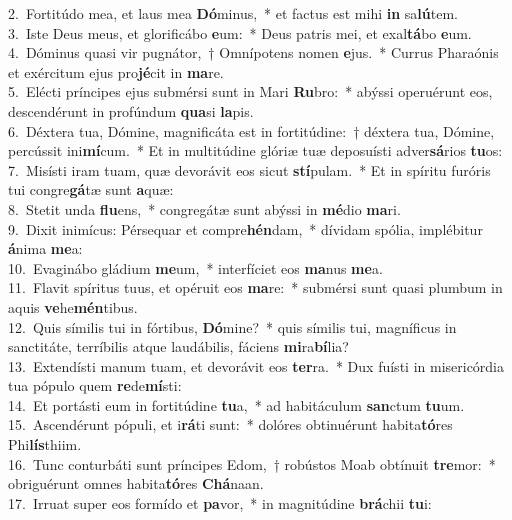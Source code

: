 {2.~}Fortitúdo mea, et laus mea \textbf{Dó}minus,~* et factus est mihi \textbf{in} sa\textbf{lú}tem.\\
{3.~}Iste Deus meus, et glorificábo \textbf{e}um:~* Deus patris mei, et exal\textbf{tá}bo \textbf{e}um.\\
{4.~}Dóminus quasi vir pugnátor,~† Omnípotens nomen \textbf{e}jus.~* Currus Pharaónis et exércitum ejus pro\textbf{jé}cit in \textbf{ma}re.\\
{5.~}Elécti príncipes ejus submérsi sunt in Mari \textbf{Ru}bro:~* abýssi operuérunt eos, descendérunt in profúndum \textbf{qua}si \textbf{la}pis.\\
{6.~}Déxtera tua, Dómine, magnificáta est in fortitúdine:~† déxtera tua, Dómine, percússit ini\textbf{mí}cum.~* Et in multitúdine glóriæ tuæ deposuísti adver\textbf{sá}rios \textbf{tu}os:\\
{7.~}Misísti iram tuam, quæ devorávit eos sicut \textbf{stí}pulam.~* Et in spíritu furóris tui congre\textbf{gá}tæ sunt \textbf{a}quæ:\\
{8.~}Stetit unda \textbf{flu}ens,~* congregátæ sunt abýssi in \textbf{mé}dio \textbf{ma}ri.\\
{9.~}Dixit inimícus: Pérsequar et compre\textbf{hén}dam,~* dívidam spólia, implébitur \textbf{á}nima \textbf{me}a:\\
{10.~}Evaginábo gládium \textbf{me}um,~* interfíciet eos \textbf{ma}nus \textbf{me}a.\\
{11.~}Flavit spíritus tuus, et opéruit eos \textbf{ma}re:~* submérsi sunt quasi plumbum in aquis \textbf{ve}he\textbf{mén}tibus.\\
{12.~}Quis símilis tui in fórtibus, \textbf{Dó}mine?~* quis símilis tui, magníficus in sanctitáte, terríbilis atque laudábilis, fáciens \textbf{mi}ra\textbf{bí}lia?\\
{13.~}Extendísti manum tuam, et devorávit eos \textbf{ter}ra.~* Dux fuísti in misericórdia tua pópulo quem \textbf{re}de\textbf{mí}sti:\\
{14.~}Et portásti eum in fortitúdine \textbf{tu}a,~* ad habitáculum \textbf{san}ctum \textbf{tu}um.\\
{15.~}Ascendérunt pópuli, et i\textbf{rá}ti sunt:~* dolóres obtinuérunt habita\textbf{tó}res Phi\textbf{lís}thiim.\\
{16.~}Tunc conturbáti sunt príncipes Edom,~† robústos Moab obtínuit \textbf{tre}mor:~* obriguérunt omnes habita\textbf{tó}res \textbf{Chá}naan.\\
{17.~}Irruat super eos formído et \textbf{pa}vor,~* in magnitúdine \textbf{brá}chii \textbf{tu}i:\\
